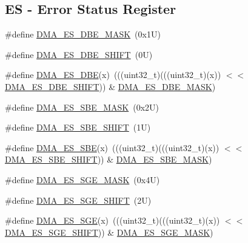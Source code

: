 \subsection*{ES -\/ Error Status Register}
\begin{DoxyCompactItemize}
\item 
\#define \mbox{\hyperlink{group___d_m_a___register___masks_ga9f9f3b164205ff0e8837dac47f0d79c2}{D\+M\+A\+\_\+\+E\+S\+\_\+\+D\+B\+E\+\_\+\+M\+A\+SK}}~(0x1\+U)
\item 
\#define \mbox{\hyperlink{group___d_m_a___register___masks_ga7a9dcb905c2d9eb68285fe0fdebf7f64}{D\+M\+A\+\_\+\+E\+S\+\_\+\+D\+B\+E\+\_\+\+S\+H\+I\+FT}}~(0\+U)
\item 
\#define \mbox{\hyperlink{group___d_m_a___register___masks_ga23b74ecd43a92de727826fcf847548d1}{D\+M\+A\+\_\+\+E\+S\+\_\+\+D\+BE}}(x)~(((uint32\+\_\+t)(((uint32\+\_\+t)(x)) $<$$<$ \mbox{\hyperlink{group___d_m_a___register___masks_ga7a9dcb905c2d9eb68285fe0fdebf7f64}{D\+M\+A\+\_\+\+E\+S\+\_\+\+D\+B\+E\+\_\+\+S\+H\+I\+FT}})) \& \mbox{\hyperlink{group___d_m_a___register___masks_ga9f9f3b164205ff0e8837dac47f0d79c2}{D\+M\+A\+\_\+\+E\+S\+\_\+\+D\+B\+E\+\_\+\+M\+A\+SK}})
\item 
\#define \mbox{\hyperlink{group___d_m_a___register___masks_ga73f04cd2c448f23f1157c7803d57973b}{D\+M\+A\+\_\+\+E\+S\+\_\+\+S\+B\+E\+\_\+\+M\+A\+SK}}~(0x2\+U)
\item 
\#define \mbox{\hyperlink{group___d_m_a___register___masks_gad47f4bb417685a2e098d2c1c6cf80c81}{D\+M\+A\+\_\+\+E\+S\+\_\+\+S\+B\+E\+\_\+\+S\+H\+I\+FT}}~(1\+U)
\item 
\#define \mbox{\hyperlink{group___d_m_a___register___masks_ga3a595507af4eb13a4d79ce82e2d7d7e3}{D\+M\+A\+\_\+\+E\+S\+\_\+\+S\+BE}}(x)~(((uint32\+\_\+t)(((uint32\+\_\+t)(x)) $<$$<$ \mbox{\hyperlink{group___d_m_a___register___masks_gad47f4bb417685a2e098d2c1c6cf80c81}{D\+M\+A\+\_\+\+E\+S\+\_\+\+S\+B\+E\+\_\+\+S\+H\+I\+FT}})) \& \mbox{\hyperlink{group___d_m_a___register___masks_ga73f04cd2c448f23f1157c7803d57973b}{D\+M\+A\+\_\+\+E\+S\+\_\+\+S\+B\+E\+\_\+\+M\+A\+SK}})
\item 
\#define \mbox{\hyperlink{group___d_m_a___register___masks_ga715f52ab979f3de95d541dc3e58d08aa}{D\+M\+A\+\_\+\+E\+S\+\_\+\+S\+G\+E\+\_\+\+M\+A\+SK}}~(0x4\+U)
\item 
\#define \mbox{\hyperlink{group___d_m_a___register___masks_gac41f0a3ee7fad8b4f88466de93947c98}{D\+M\+A\+\_\+\+E\+S\+\_\+\+S\+G\+E\+\_\+\+S\+H\+I\+FT}}~(2\+U)
\item 
\#define \mbox{\hyperlink{group___d_m_a___register___masks_gab984042e294046b1ddc36fb0427bfe99}{D\+M\+A\+\_\+\+E\+S\+\_\+\+S\+GE}}(x)~(((uint32\+\_\+t)(((uint32\+\_\+t)(x)) $<$$<$ \mbox{\hyperlink{group___d_m_a___register___masks_gac41f0a3ee7fad8b4f88466de93947c98}{D\+M\+A\+\_\+\+E\+S\+\_\+\+S\+G\+E\+\_\+\+S\+H\+I\+FT}})) \& \mbox{\hyperlink{group___d_m_a___register___masks_ga715f52ab979f3de95d541dc3e58d08aa}{D\+M\+A\+\_\+\+E\+S\+\_\+\+S\+G\+E\+\_\+\+M\+A\+SK}})
$$
\end{DoxyCompactItemize}
